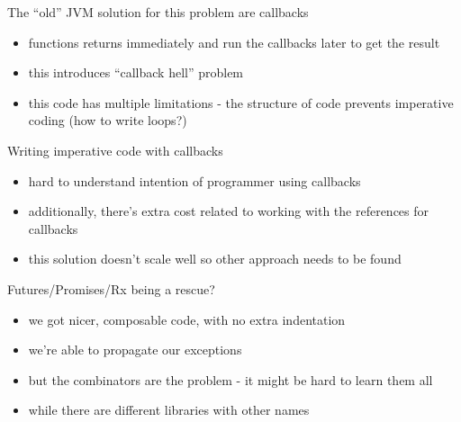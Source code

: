 \documentclass[hyperref={pdfpagelabels=false},xcolor={dvipsnames},compress,onlytextwidth]{beamer}
\begin{document}
    \begin{frame}[fragile]{The ``old'' JVM solution for this problem are callbacks}
        \pause
        \begin{itemize}
            \item functions returns immediately and run the callbacks later to get the result\pause
            \item this introduces ``callback hell'' problem\pause
            \item this code has multiple limitations - the structure of code prevents imperative coding (how to write loops?)
        \end{itemize}
    \end{frame}

    \begin{frame}[fragile]{Writing imperative code with callbacks}
        \only<1>{}
        \begin{itemize}
            \item<3-> hard to understand intention of programmer using callbacks
            \item<4-> additionally, there's extra cost related to working with the references for callbacks
            \item<5-> this solution doesn't scale well so other approach needs to be found
        \end{itemize}
    \end{frame}

    \begin{frame}[fragile]{Futures/Promises/Rx being a rescue?}
        \pause
        \begin{itemize}
            \item we got nicer, composable code, with no extra indentation\pause
            \item we're able to propagate our exceptions\pause
            \item but the combinators are the problem - it might be hard to learn them all\pause
            \item while there are different libraries with other names
        \end{itemize}
    \end{frame}
\end{document}
